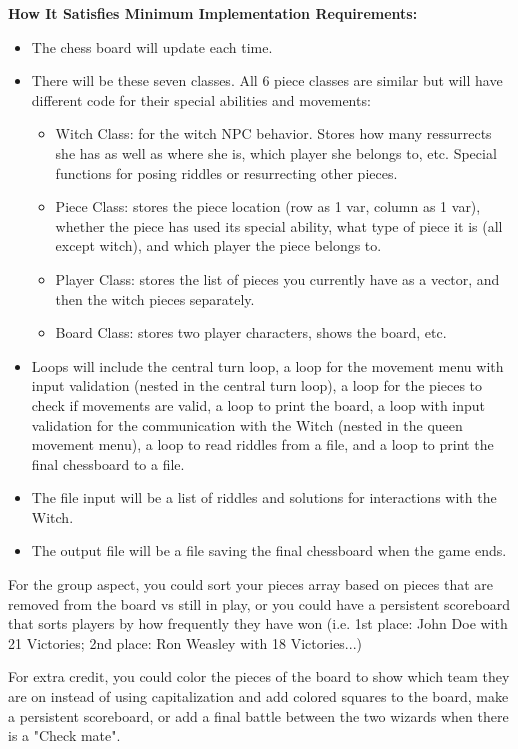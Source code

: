 \textbf{How It Satisfies Minimum Implementation Requirements:}
\begin{itemize}
    \item The chess board will update each time.
    \item There will be these seven classes. All 6 piece classes are similar but will have different code for their special abilities and movements:
    \begin{itemize}
        \item Witch Class: for the witch NPC behavior. Stores how many ressurrects she has as well as where she is, which player she belongs to, etc. Special functions for posing riddles or resurrecting other pieces.
        \item Piece Class: stores the piece location (row as 1 var, column as 1 var), whether the piece has used its special ability, what type of piece it is (all except witch), and which player the piece belongs to.
        \item Player Class: stores the list of pieces you currently have as a vector, and then the witch pieces separately.
        \item Board Class: stores two player characters, shows the board, etc.
    \end{itemize}
    \item Loops will include the central turn loop, a loop for the movement menu with input validation (nested in the central turn loop), a loop for the pieces to check if movements are valid, a loop to print the board, a loop with input validation for the communication with the Witch (nested in the queen movement menu), a loop to read riddles from a file, and a loop to print the final chessboard to a file.
    \item The file input will be a list of riddles and solutions for interactions with the Witch.
    \item The output file will be a file saving the final chessboard when the game ends.
\end{itemize}

For the group aspect, you could sort your pieces array based on pieces that are removed from the board vs still in play, or you could have a persistent scoreboard that sorts players by how frequently they have won (i.e. 1st place: John Doe with 21 Victories; 2nd place: Ron Weasley with 18 Victories...) 

For extra credit, you could color the pieces of the board to show which team they are on instead of using capitalization and add colored squares to the board, make a persistent scoreboard, or add a final battle between the two wizards when there is a "Check mate". 
